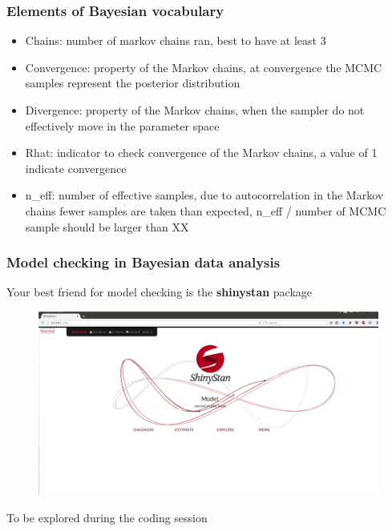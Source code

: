 \documentclass{beamer}
\begin{document}
   
  \begin{frame}
  \frametitle{\bf Elements of Bayesian vocabulary}
  
   \begin{itemize}
   \item Chains: number of markov chains ran, best to have at least 3
   \item Convergence: property of the Markov chains, at convergence the MCMC samples represent the posterior distribution
   \item Divergence: property of the Markov chains, when the sampler do not effectively move in the parameter space
   \item Rhat: indicator to check convergence of the Markov chains, a value of 1 indicate convergence
   \item n\_eff: number of effective samples, due to autocorrelation in the Markov chains fewer samples are taken than expected, n\_eff / number of MCMC sample should be larger than XX
  \end{itemize}

  
 \end{frame}
 
  \begin{frame}
  \frametitle{\bf Model checking in Bayesian data analysis}
  
  Your best friend for model checking is the \textbf{shinystan} package
  
  \begin{figure}
   \includegraphics[width=\textwidth,height=.7\textheight,keepaspectratio]{shiny.png}
  \end{figure}
  
  To be explored during the coding session

  
 \end{frame}
 
\end{document}
